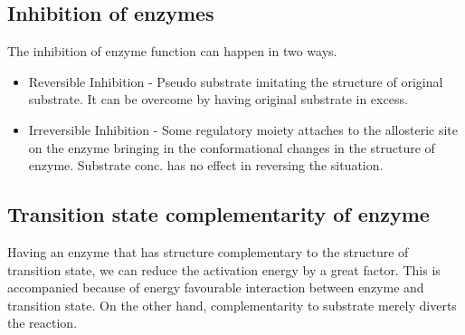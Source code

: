 \documentclass[12pt]{article}
\begin{document}
\subsection{Inhibition of enzymes}
The inhibition of enzyme function can happen in two ways.
\begin{itemize}
\item Reversible Inhibition - Pseudo substrate imitating the structure of original substrate. It can be overcome by having original substrate in excess.
\item Irreversible Inhibition - Some regulatory moiety attaches to the allosteric site on the enzyme bringing in the conformational changes in the structure of enzyme. Substrate conc. has no effect in reversing the situation.
\end{itemize}

\subsection{Transition state complementarity of enzyme}
Having an enzyme that has structure complementary to the structure of transition state, we can reduce the activation energy by a great factor. This is accompanied because of energy favourable interaction between enzyme and transition state. On the other hand, complementarity to substrate merely diverts the reaction. 
\end{document}

